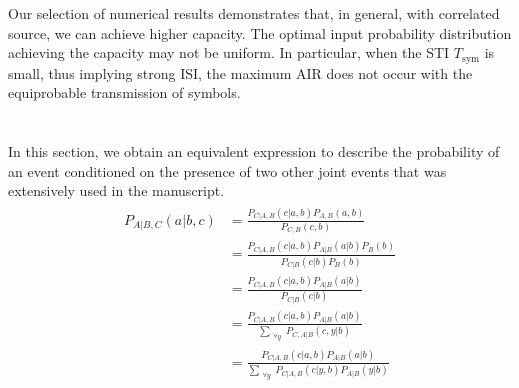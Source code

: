 \documentclass[journal]{IEEEtranTCOM}
\begin{document}
Our selection of numerical results demonstrates that, in general, with correlated source, we can achieve higher capacity. The optimal input probability distribution achieving the capacity may not be uniform. In particular, when the STI $T_{\mathrm{sym}}$ is small, thus implying strong ISI, the maximum AIR does not occur with the equiprobable transmission of symbols.
\appendices
  \section{}
  In this section, we obtain an equivalent expression to describe the probability of an event conditioned on the presence of two other joint events that was extensively used in the manuscript.
  \label{FirstAppendix}
  \begin{align}
    \begin{split}
        P_{A|B,C}(a|b,c) &= \frac{P_{C|A,B}(c|a,b)P_{A,B}(a,b)}{P_{C,B}(c,b)}\\& =\frac{P_{C|A,B}(c|a,b)P_{A|B}(a|b)P_{B}(b)}{P_{C|B}(c|b)P_{B}(b)}\\&
        =\frac{P_{C|A,B}(c|a,b)P_{A|B}(a|b)}{P_{C|B}(c|b)}\\&
        = \frac{P_{C|A,B}(c|a,b)P_{A|B}(a|b)}{\sum\limits_{\substack{\forall y} } P_{C,A|B}(c,y|b)}\\&
        =\frac{P_{C|A,B}(c|a,b)P_{A|B}(a|b)}{\sum\limits_{\substack{\forall y} }P_{C|A,B}(c|y,b)P_{A|B}(y|b)}
    \end{split}
\end{align}
\ifCLASSOPTIONcaptionsoff
  \newpage
\fi


\end{document}
